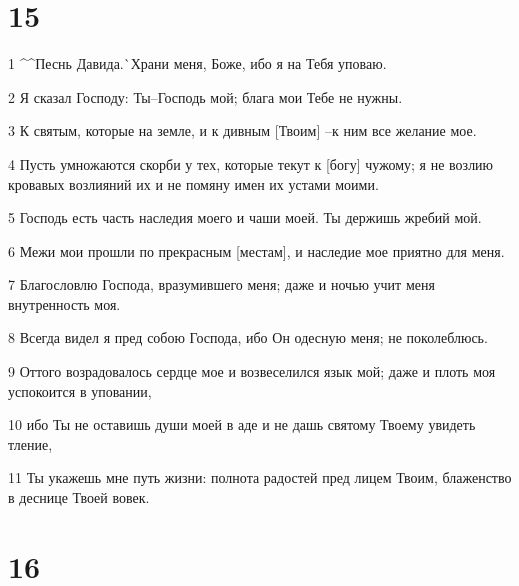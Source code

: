 \chapter{15}

\par 1 ^^Песнь Давида.^^ Храни меня, Боже, ибо я на Тебя уповаю.
\par 2 Я сказал Господу: Ты--Господь мой; блага мои Тебе не нужны.
\par 3 К святым, которые на земле, и к дивным [Твоим] --к ним все желание мое.
\par 4 Пусть умножаются скорби у тех, которые текут к [богу] чужому; я не возлию кровавых возлияний их и не помяну имен их устами моими.
\par 5 Господь есть часть наследия моего и чаши моей. Ты держишь жребий мой.
\par 6 Межи мои прошли по прекрасным [местам], и наследие мое приятно для меня.
\par 7 Благословлю Господа, вразумившего меня; даже и ночью учит меня внутренность моя.
\par 8 Всегда видел я пред собою Господа, ибо Он одесную меня; не поколеблюсь.
\par 9 Оттого возрадовалось сердце мое и возвеселился язык мой; даже и плоть моя успокоится в уповании,
\par 10 ибо Ты не оставишь души моей в аде и не дашь святому Твоему увидеть тление,
\par 11 Ты укажешь мне путь жизни: полнота радостей пред лицем Твоим, блаженство в деснице Твоей вовек.

\chapter{16}

